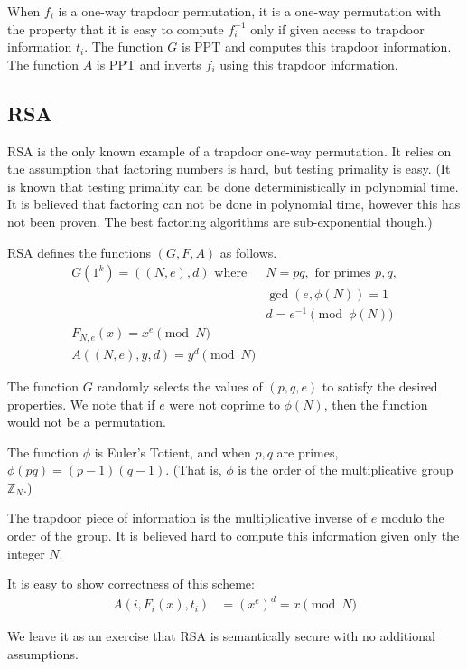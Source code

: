 When $f_i$ is a one-way trapdoor permutation, it is a one-way permutation with
the property that it is easy to compute $f_i^{-1}$ only if given access to trapdoor
information $t_i$. The function $G$ is PPT and computes this trapdoor information.
The function $A$ is PPT and inverts $f_i$ using this trapdoor information.

\subsection{RSA}

RSA is the only known example of a trapdoor one-way permutation.
It relies on the assumption that factoring numbers is hard,
but testing primality is easy. (It is known that testing primality can be done
deterministically in polynomial time. It is believed that factoring can not be done in
polynomial time, however this has not been proven. The best factoring algorithms
are sub-exponential though.)

\begin{definition}
RSA defines the functions $(G, F, A)$ as follows.
\begin{align*}
G(1^k) = ((N, e), d) \,\,\text{where} \,\,& N=pq, \,\, \text{for primes $p,q$},  \\
& \gcd(e,\phi(N))=1 \\
& d = e^{-1} \pmod{\phi(N)} \\
F_{N,e}(x) = x^e \pmod{N} & \\
A((N,e),y, d) = y^d \pmod{N} &
\end{align*}
\end{definition}

The function $G$ randomly selects the values of $(p, q, e)$ to satisfy the desired properties. We note that if  $e$ were not coprime to $\phi(N)$, then the function would
not be a permutation.

The function $\phi$ is Euler's Totient, and when $p,q$ are primes,
$\phi(pq) = (p-1)(q-1)$.
(That is, $\phi$ is the order of the multiplicative group $\mathbb{Z}_N$.)

The trapdoor piece of information is the multiplicative inverse of $e$ modulo the order of the
group. It is believed hard to compute this information given only the integer $N$.

It is easy to show correctness of this scheme:
\begin{align*}
A(i, F_i(x), t_i) &= (x^e)^d = x \pmod{N}
\end{align*}

We leave it as an exercise that RSA is semantically
secure with no additional assumptions.


